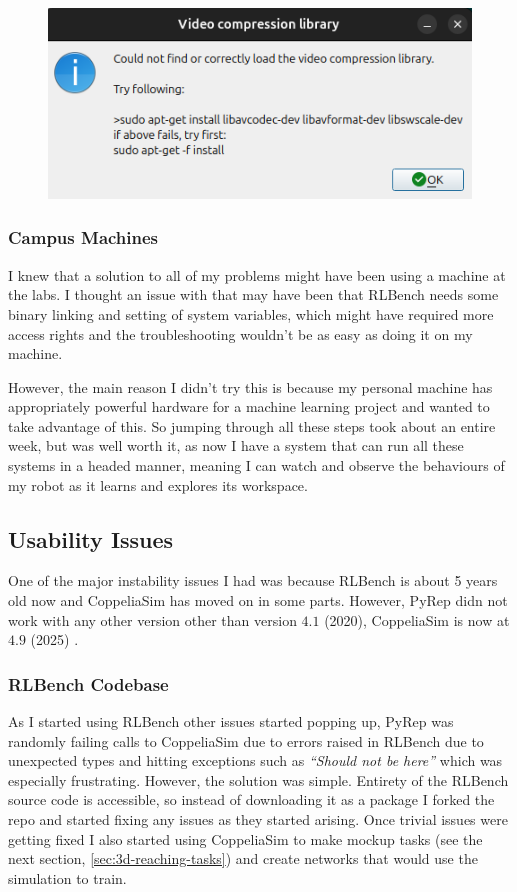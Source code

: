 \begin{figure}[htpb] %
  \centering
  \includegraphics[scale=0.3]{assets/early-work/missing-libs.png}
  \caption{}\label{fig:missing-libs}
\end{figure}


\subsubsection{Campus Machines}
I knew that a solution to all of my problems might have been using a machine at the labs. I thought an issue with that may have been that RLBench needs some binary linking and setting of system variables, which might have required more access rights and the troubleshooting wouldn't be as easy as doing it on my machine. 

However, the main reason I didn't try this is because my personal machine has appropriately powerful hardware for a machine learning project and wanted to take advantage of this. So jumping through all these steps took about an entire week, but was well worth it, as now I have a system that can run all these systems in a headed manner, meaning I can watch and observe the behaviours of my robot as it learns and explores its workspace.

\subsection{Usability Issues}
One of the major instability issues I had was because RLBench is about 5 years old now and CoppeliaSim has moved on in some parts. However, PyRep didn not work with any other version other than version $4.1$ (2020), CoppeliaSim is now at $4.9$ (2025) \cite{coppeliaSimManual}.

\subsubsection{RLBench Codebase}
As I started using RLBench other issues started popping up, PyRep was randomly failing calls to CoppeliaSim due to errors raised in RLBench due to unexpected types and hitting exceptions such as \emph{``Should not be here''} which was especially frustrating. However, the solution was simple. Entirety of the RLBench source code is accessible, so instead of downloading it as a package I forked the repo and started fixing any issues as they started arising. Once trivial issues were getting fixed I also started using CoppeliaSim to make mockup tasks (see the next section, \ref{sec:3d-reaching-tasks}) and create networks that would use the simulation to train.

